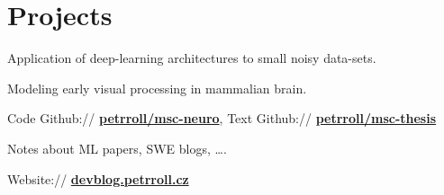 \documentclass[a4paper]{deedy-resume} %
\begin{document}
\begin{minipage}[t]{0.62\textwidth}
\section{Projects}


\emptyLocation %
\begin{tightitemize}
\item Application of deep-learning architectures to small noisy data-sets.
\item Modeling early visual processing in mammalian brain.
\item Code Github:// \href{https://github.com/petrroll/msc-neuro}{\bf petrroll/msc-neuro}, Text Github:// \href{https://github.com/petrroll/msc-thesis}{\bf petrroll/msc-thesis}
\end{tightitemize}

\halfsectionspace %




\emptyLocation %
\begin{tightitemize}
\item Notes about ML papers, SWE blogs, \dots .
\item Website:// \href{https://devblog.petrroll.cz}{\bf devblog.petrroll.cz}
\end{tightitemize}


\end{minipage}
\end{document}
